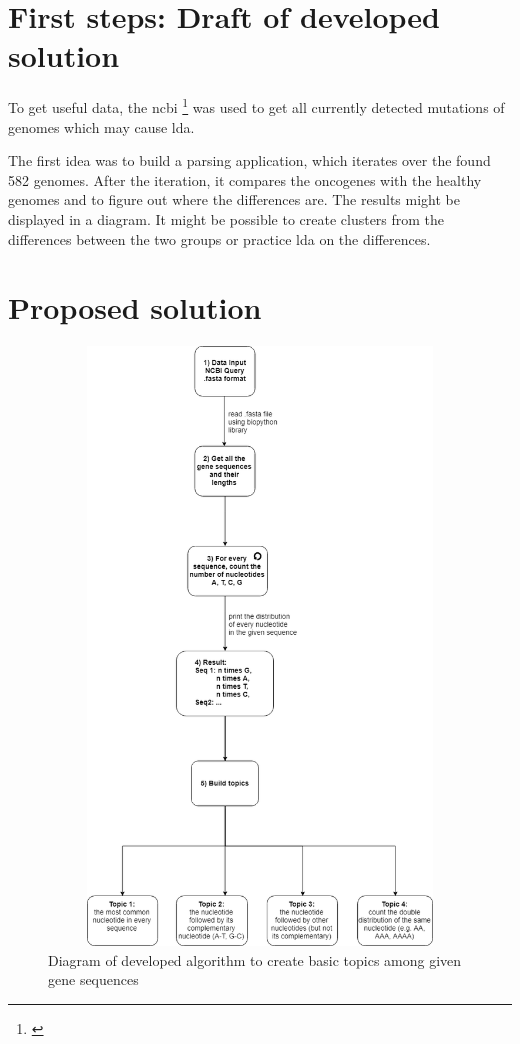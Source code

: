 \section{First steps: Draft of developed solution}\label{draft}

To get useful data, the \gls{ncbi} \footnote{\autocite{ncbi}} was used to get all currently detected mutations of genomes which may cause \gls{lda}.

The first idea was to build a parsing application, which iterates over the found 582 genomes. After the iteration, it compares the oncogenes with the healthy genomes and to figure out where the differences are. The results might be displayed in a diagram. It might be possible to create clusters from the differences between the two groups or practice \gls{lda} on the differences.

\section{Proposed solution}\label{proposed_solution}

\begin{figure}[htbp]
	\centering
	\includegraphics[width=1\textwidth, height=600px, keepaspectratio]{Image/creating_topics_algorithm.png}
	\caption{Diagram of developed algorithm to create basic topics among given gene sequences}
	\label{algorithm_figure}
\end{figure}

